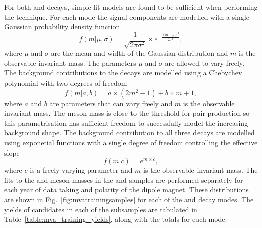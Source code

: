 For both \decay{\Bs}{\jpsi\phiz} and \decay{\Bsb}{\Dsp\pim} decays, simple fit models are found to be sufficient when performing the \sPlot technique. For each mode the signal components are modelled with a single Gaussian probability density function
\begin{equation}
f(m|\mu,\sigma) = \frac{1}{\sqrt{2\pi\sigma^{2}}} \times e^{-\frac{(m-\mu)^{2}}{2\sigma^{2}}}, 
\end{equation}
where $\mu$ and $\sigma$ are the mean and width of the Gaussian distribution and $m$ is the observable invariant mass. The parameters $\mu$ and $\sigma$ are allowed to vary freely.
The background contributions to the \decay{\phiz}{\Kp\Km} decays are modelled using a Chebychev polynomial with two degrees of freedom
\begin{equation}
f(m|a,b) = a\times(2m^{2}-1) + b\times m + 1,
\end{equation}
where $a$ and $b$ are parameters that can vary freely and $m$ is the observable invariant mass. 
The \phiz meson mass is close to the threshold for \Kp\Km pair production so this parametrisation has sufficient freedom to successfully  model the increasing background shape.
The background contribution to all three \Dsp decays are modelled using exponetial functions with a single degree of freedom controlling the effective slope
\begin{equation}
f(m|c) = e^{m\times c},
\end{equation}
where $c$ is a freely varying parameter and $m$ is the observable invariant mass.
The fits to the \phiz and \Dsp meson masses in the \decay{\Bs}{\jpsi\phiz} and \decay{\Bsb}{\Dsp\pim} samples are performed separately for each year of data taking and polarity of the \lhcb dipole magnet. These distributions are shown in Fig.~\ref{fig:mvatrainingsamples} for each of the \phiz and \Dsp decay modes.
The yields of candidates in each of the subsamples are tabulated in Table~\ref{table:mva_training_yields}, along with the totals for each mode. 


